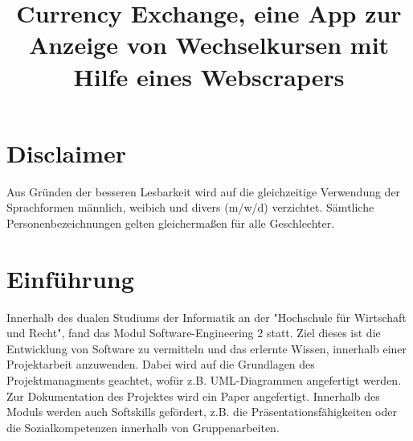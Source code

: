 \documentclass[conference]{IEEEtran}
\begin{document}
\title{Currency Exchange, eine App zur Anzeige von Wechselkursen mit Hilfe eines Webscrapers}


\author{
\and
{}
\and
{}
}

\maketitle


\section{Disclaimer}
Aus Gründen der besseren Lesbarkeit wird auf die gleichzeitige Verwendung der Sprachformen männlich, weibich und divers (m/w/d) verzichtet. Sämtliche Personenbezeichnungen gelten gleichermaßen für alle Geschlechter.

\section{Einführung}
Innerhalb des dualen Studiums der Informatik an der "Hochschule für Wirtschaft und Recht", fand das Modul Software-Engineering 2 statt. Ziel dieses ist die Entwicklung von Software zu vermitteln und das erlernte Wissen, innerhalb einer Projektarbeit anzuwenden. Dabei wird auf die Grundlagen des Projektmanagments geachtet, wofür z.B. UML-Diagrammen angefertigt werden. Zur Dokumentation des Projektes wird ein Paper angefertigt. 
Innerhalb des Moduls werden auch Softskills gefördert, z.B. die Präsentationsfähigkeiten oder die Sozialkompetenzen innerhalb von Gruppenarbeiten.
\end{document}
